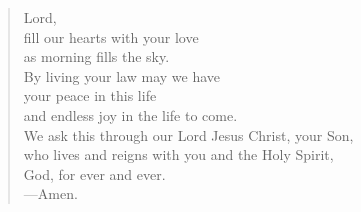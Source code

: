 \prayer

\setlength{\leftmargini}{\prayerleftmargini}

\begin{verse}
Lord,\\
fill our hearts with your love\\
as morning fills the sky.\\
By living your law may we have\\
your peace in this life\\
and endless joy in the life to come.\\
We ask this through our Lord Jesus Christ, your Son,\\
who lives and reigns with you and the Holy Spirit,\\
God, for ever and ever.\\
{\color{red}---\thinspace}Amen.
\end{verse}

\setlength{\leftmargini}{\defleftmargini}